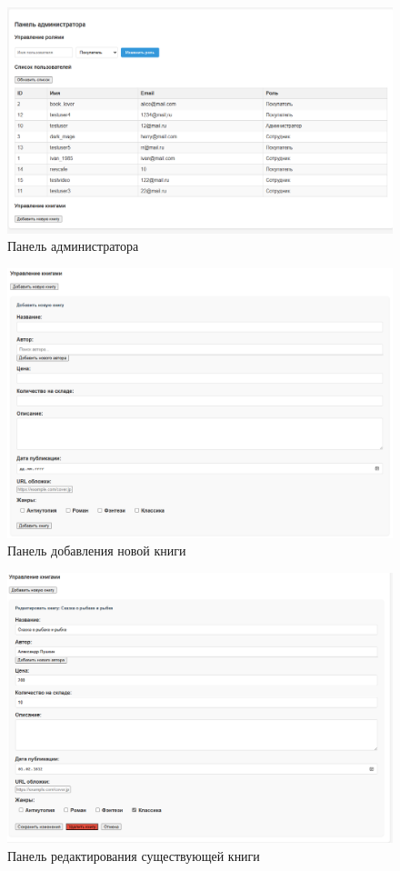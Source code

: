 \begin{figure}[H]
	\centering
	\includegraphics[width=0.7\linewidth]{images/панельадмина}
	\caption{Панель администратора}
	\label{fig:}
\end{figure}

\begin{figure}[H]
	\centering
	\includegraphics[width=0.7\linewidth]{images/добавление}
	\caption{Панель добавления новой книги}
	\label{fig:}
\end{figure}

\begin{figure}[H]
	\centering
	\includegraphics[width=0.7\linewidth]{images/редактирование}
	\caption{Панель редактирования существующей книги}
	\label{fig:}
\end{figure}

